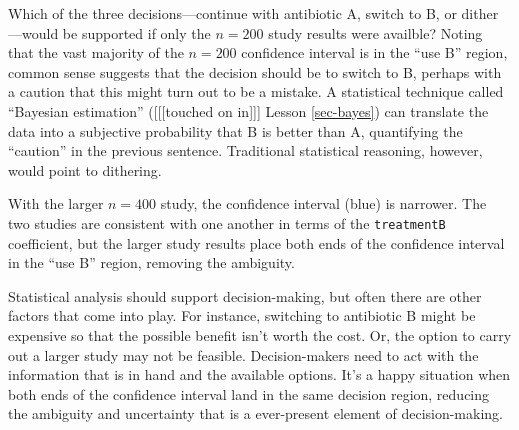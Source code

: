 \documentclass[
  letterpaper,
  DIV=11,
  numbers=noendperiod,
  oneside]{scrartcl}
\begin{document}
\begin{figure}



\end{figure}%

Which of the three decisions---continue with antibiotic A, switch to B,
or dither---would be supported if only the \(n=200\) study results were
availble? Noting that the vast majority of the \(n=200\) confidence
interval is in the ``use B'' region, common sense suggests that the
decision should be to switch to B, perhaps with a caution that this
might turn out to be a mistake. A statistical technique called
``Bayesian estimation'' ({[}{[}{[}touched on in{]}{]}{]} Lesson
\ref{sec-bayes}) can translate the data into a subjective probability
that B is better than A, quantifying the ``caution'' in the previous
sentence. Traditional statistical reasoning, however, would point to
dithering.

With the larger \(n=400\) study, the confidence interval (blue) is
narrower. The two studies are consistent with one another in terms of
the \texttt{treatmentB} coefficient, but the larger study results place
both ends of the confidence interval in the ``use B'' region, removing
the ambiguity.

Statistical analysis should support decision-making, but often there are
other factors that come into play. For instance, switching to antibiotic
B might be expensive so that the possible benefit isn't worth the cost.
Or, the option to carry out a larger study may not be feasible.
Decision-makers need to act with the information that is in hand and the
available options. It's a happy situation when both ends of the
confidence interval land in the same decision region, reducing the
ambiguity and uncertainty that is a ever-present element of
decision-making.
\end{document}
